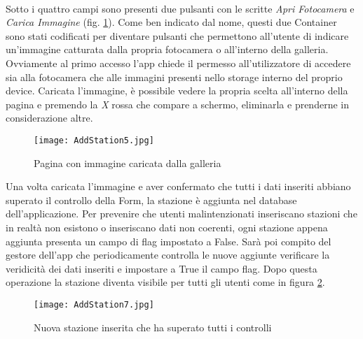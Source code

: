 \\
Sotto i quattro campi sono presenti due pulsanti con le scritte \textit{Apri
Fotocamera} e \textit{Carica Immagine} (fig. \ref{addStation5}). Come ben indicato dal nome, questi due
Container sono stati codificati per diventare pulsanti che permettono
all'utente di indicare un'immagine catturata dalla propria fotocamera o
all'interno 
della galleria. Ovviamente al primo accesso l'app chiede il permesso
all'utilizzatore di accedere sia alla fotocamera che alle immagini presenti nello storage
interno del proprio device. Caricata l'immagine, è possibile vedere la propria
scelta all'interno della pagina e premendo la \textit{X} rossa che compare a schermo,
eliminarla e prenderne in considerazione altre.
\begin{figure}
    \centering
    \texttt{[image: AddStation5.jpg]}
    \caption{Pagina con immagine caricata dalla galleria}
    \label{addStation5}
\end{figure}
Una volta caricata l'immagine e aver confermato che tutti i dati inseriti
abbiano superato il controllo della Form, la stazione è aggiunta nel database
dell'applicazione. Per prevenire che utenti malintenzionati inseriscano stazioni
che in realtà non esistono o inseriscano dati non coerenti, ogni stazione appena
aggiunta presenta un campo di flag impostato a False. Sarà poi compito del gestore
dell'app che periodicamente controlla le nuove aggiunte verificare la
veridicità dei dati inseriti e impostare a True il campo flag. Dopo questa
operazione la stazione diventa visibile per tutti gli utenti come in figura
\ref{addStation7}.
\begin{figure}[!h]
    \centering
    \texttt{[image: AddStation7.jpg]}
    \caption{Nuova stazione inserita che ha superato tutti i controlli}
    \label{addStation7}
\end{figure}

